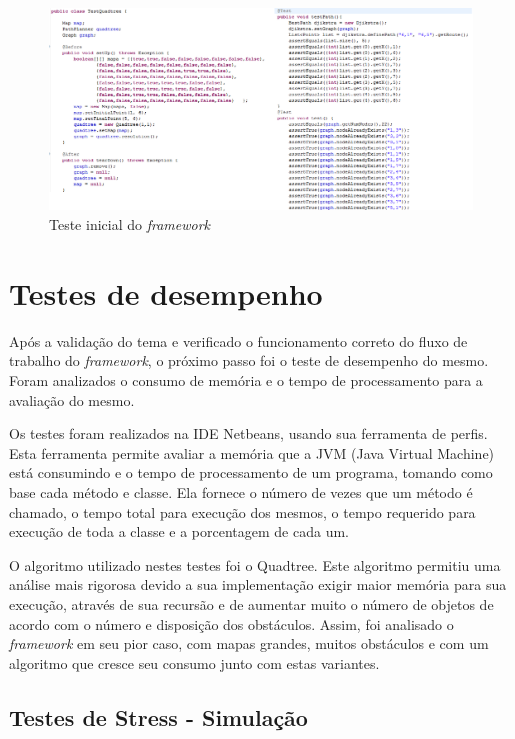 \begin{figure}[h]
	\centering
	\label{fig34}
		\includegraphics[keepaspectratio=true,scale=0.6]{figuras/testeinicial.png}
	\caption{Teste inicial do \textit{framework}}
\end{figure}

\section{Testes de desempenho}

Após a validação do tema e verificado o funcionamento correto do fluxo de trabalho do \textit{framework}, o próximo passo foi o teste de desempenho do mesmo. Foram analizados o consumo de memória e o tempo de processamento para a avaliação do mesmo. 

Os testes foram realizados na IDE Netbeans, usando sua ferramenta de perfis. Esta ferramenta permite avaliar a memória que a JVM (Java Virtual Machine) está consumindo e o tempo de processamento de um programa, tomando como base cada método e classe. Ela fornece o número de vezes que um método é chamado, o tempo total para execução dos mesmos, o tempo requerido para execução de toda a classe e a porcentagem de cada um.

O algoritmo utilizado nestes testes foi o Quadtree. Este algoritmo permitiu uma análise mais rigorosa devido a sua implementação exigir maior memória para sua execução, através de sua recursão e de aumentar muito o número de objetos de acordo com o número e disposição dos obstáculos. Assim, foi analisado o \textit{framework} em seu pior caso, com mapas grandes, muitos obstáculos e com um algoritmo que cresce seu consumo junto com estas variantes.

\subsection{Testes de Stress - Simulação}

